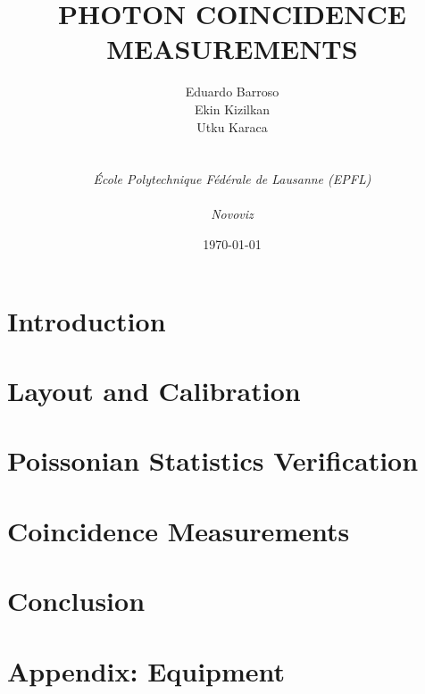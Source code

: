 \documentclass{document_layout}
\title{PHOTON COINCIDENCE MEASUREMENTS}
\author{
    Eduardo Barroso\address{1} \quad Ekin Kizilkan\address{1} \quad Utku Karaca \address{2} \\[1em]
    \address{1} \textit{École Polytechnique Fédérale de Lausanne (EPFL)} \\
    \address{2} \textit{Novoviz}
}
\date{\today}
\begin{document}
\maketitle

\section*{Introduction}


\newpage
\onecolumn
\tableofcontents
\twocolumn

\newpage
\section{Layout and Calibration}


\section{Poissonian Statistics Verification}


\newpage
\section{Coincidence Measurements} %




\section*{Conclusion}


\newpage
\section*{Appendix: Equipment}
 

\onecolumn
\printbibliography
{}
\twocolumn
\end{document}

